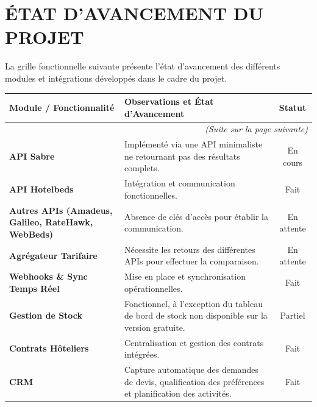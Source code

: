 \documentclass[11pt,a4paper]{report}
\begin{document}
\chapter{ÉTAT D'AVANCEMENT DU PROJET}

La grille fonctionnelle suivante présente l'état d'avancement des différents modules et intégrations développés dans le cadre du projet.

\begingroup
\setlength{\LTpre}{10pt}
\setlength{\LTpost}{10pt}
\begin{longtable}{|p{3cm}|p{8.5cm}|c|}
    \hline
    \textbf{Module / Fonctionnalité} & \textbf{Observations et État d'Avancement} & \textbf{Statut} \\ \hline
    \endhead

    \hline \multicolumn{3}{r}{\textit{(Suite sur la page suivante)}} \\ \hline
    \endfoot

    \hline
    \endlastfoot

    \textbf{API Sabre} & Implémenté via une API minimaliste ne retournant pas des résultats complets. & En cours \\ \hline
    
    \textbf{API Hotelbeds} & Intégration et communication fonctionnelles. & Fait \\ \hline
    
    \textbf{Autres APIs (Amadeus, Galileo, RateHawk, WebBeds)} & Absence de clés d'accès pour établir la communication. & En attente \\ \hline
    
    \textbf{Agrégateur Tarifaire} & Nécessite les retours des différentes APIs pour effectuer la comparaison. & En attente \\ \hline
    
    \textbf{Webhooks \& Sync Temps Réel} & Mise en place et synchronisation opérationnelles. & Fait \\ \hline
    
    \textbf{Gestion de Stock} & Fonctionnel, à l'exception du tableau de bord de stock non disponible sur la version gratuite. & Partiel \\ \hline
    
    \textbf{Contrats Hôteliers} & Centralisation et gestion des contrats intégrées. & Fait \\ \hline
    
    \textbf{CRM} & Capture automatique des demandes de devis, qualification des préférences et planification des activités. & Fait \\ \hline
    

\end{longtable}
\end{document}
